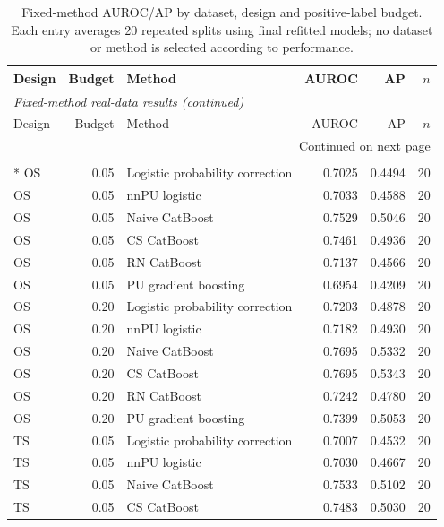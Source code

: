 \begingroup
\fontsize{9.5}{11}\selectfont
\setlength{\tabcolsep}{3.5pt}
\renewcommand{\arraystretch}{1.0}
\begin{longtable}{@{}p{0.65in}rp{2.85in}rrr@{}}
\caption{Fixed-method AUROC/AP by dataset, design and positive-label budget. Each entry averages 20 repeated splits using final refitted models; no dataset or method is selected according to performance.}\label{tab:s-real-fixed-methods}\\
\toprule
Design & Budget & Method & AUROC & AP & $n$ \\
\midrule
\endfirsthead
\multicolumn{6}{l}{\textit{Fixed-method real-data results (continued)}}\\
\toprule
Design & Budget & Method & AUROC & AP & $n$ \\
\midrule
\endhead
\midrule\multicolumn{6}{r}{Continued on next page}\\\endfoot
\bottomrule\endlastfoot
\multicolumn{6}{l}{\textbf{Credit Default}}\\*
OS & 0.05 & Logistic probability correction & 0.7025 & 0.4494 & 20 \\
OS & 0.05 & nnPU logistic & 0.7033 & 0.4588 & 20 \\
OS & 0.05 & Naive CatBoost & 0.7529 & 0.5046 & 20 \\
OS & 0.05 & CS CatBoost & 0.7461 & 0.4936 & 20 \\
OS & 0.05 & RN CatBoost & 0.7137 & 0.4566 & 20 \\
OS & 0.05 & PU gradient boosting & 0.6954 & 0.4209 & 20 \\
\addlinespace[2pt]
OS & 0.20 & Logistic probability correction & 0.7203 & 0.4878 & 20 \\
OS & 0.20 & nnPU logistic & 0.7182 & 0.4930 & 20 \\
OS & 0.20 & Naive CatBoost & 0.7695 & 0.5332 & 20 \\
OS & 0.20 & CS CatBoost & 0.7695 & 0.5343 & 20 \\
OS & 0.20 & RN CatBoost & 0.7242 & 0.4780 & 20 \\
OS & 0.20 & PU gradient boosting & 0.7399 & 0.5053 & 20 \\
\addlinespace[2pt]
TS & 0.05 & Logistic probability correction & 0.7007 & 0.4532 & 20 \\
TS & 0.05 & nnPU logistic & 0.7030 & 0.4667 & 20 \\
TS & 0.05 & Naive CatBoost & 0.7533 & 0.5102 & 20 \\
TS & 0.05 & CS CatBoost & 0.7483 & 0.5030 & 20 \\

\end{longtable}

